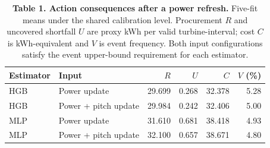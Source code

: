 \begin{table}[H]
\centering
\caption*{\textbf{Table 1. Action consequences after a power refresh.} Five-fit means under the shared calibration level. Procurement $R$ and uncovered shortfall $U$ are proxy kWh per valid turbine-interval; cost $C$ is kWh-equivalent and $V$ is event frequency. Both input configurations satisfy the event upper-bound requirement for each estimator.}
\small
\begin{tabular}{llrrrr}
\toprule
Estimator & Input & $R$ & $U$ & $C$ & $V$ (\%) \\
\midrule
HGB & Power update & 29.699 & 0.268 & 32.378 & 5.28 \\
HGB & Power + pitch update & 29.984 & 0.242 & 32.406 & 5.00 \\
MLP & Power update & 31.610 & 0.681 & 38.418 & 4.93 \\
MLP & Power + pitch update & 32.100 & 0.657 & 38.671 & 4.80 \\
\bottomrule
\end{tabular}
\end{table}
